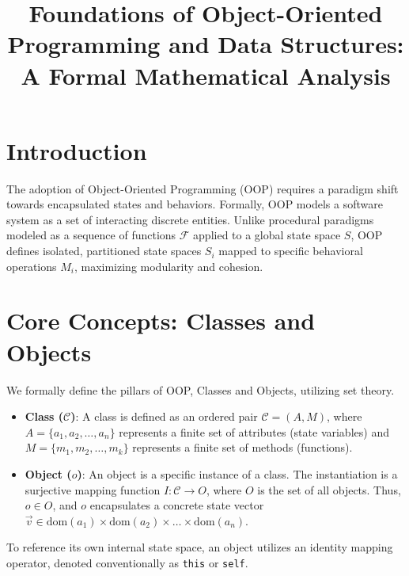 \documentclass[10pt,journal,compsoc]{IEEEtran}
\begin{document}
\title{Foundations of Object-Oriented Programming and Data Structures: A Formal Mathematical Analysis}


\maketitle
\IEEEdisplaynontitleabstractindextext
\IEEEpeerreviewmaketitle


\section{Introduction}
The adoption of Object-Oriented Programming (OOP) requires a paradigm shift towards encapsulated states and behaviors. Formally, OOP models a software system as a set of interacting discrete entities. Unlike procedural paradigms modeled as a sequence of functions $\mathcal{F}$ applied to a global state space $S$, OOP defines isolated, partitioned state spaces $S_i$ mapped to specific behavioral operations $M_i$, maximizing modularity and cohesion.

\section{Core Concepts: Classes and Objects}
We formally define the pillars of OOP, Classes and Objects, utilizing set theory.
\begin{itemize}
\item \textbf{Class ($\mathcal{C}$)}: A class is defined as an ordered pair $\mathcal{C} = (A, M)$, where $A = \{a_1, a_2, \dots, a_n\}$ represents a finite set of attributes (state variables) and $M = \{m_1, m_2, \dots, m_k\}$ represents a finite set of methods (functions). 
\item \textbf{Object ($o$)}: An object is a specific instance of a class. The instantiation is a surjective mapping function $I : \mathcal{C} \to O$, where $O$ is the set of all objects. Thus, $o \in O$, and $o$ encapsulates a concrete state vector $\vec{v} \in \text{dom}(a_1) \times \text{dom}(a_2) \times \dots \times \text{dom}(a_n)$.
\end{itemize}
To reference its own internal state space, an object utilizes an identity mapping operator, denoted conventionally as \texttt{this} or \texttt{self}.
\end{document}
